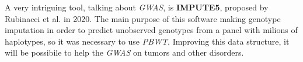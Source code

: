 \documentclass[a4paper,11pt, oneside]{article}
\begin{document}
A very intriguing tool, talking about \textit{GWAS}, is
\textbf{IMPUTE5}, proposed by Rubinacci et al. in 2020. The main purpose of this
software making genotype imputation in order to predict unobserved genotypes
from a panel with milions of haplotypes, so it was necessary to use
\textit{PBWT}. Improving this data structure, it will be possibile to help the
\textit{GWAS} on tumors and other disorders. 
\end{document}
